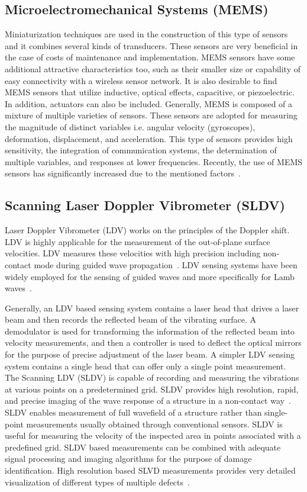 \documentclass[b5paper, 11pt, titlepage]{book}
\begin{document}
\subsection{Microelectromechanical Systems (MEMS)}
Miniaturization techniques are used in the construction of this type of sensors and it combines several kinds of transducers. These sensors are very beneficial in the case of costs of maintenance and implementation. MEMS sensors have some additional attractive characteristics too, such as their smaller size or capability of easy connectivity with a wireless sensor network. It is also desirable to find MEMS sensors that utilize inductive, optical effects, capacitive, or piezoelectric. In addition, actuators can also be included. Generally, MEMS is composed of a mixture of multiple varieties of sensors. These sensors are adopted for measuring the magnitude of distinct variables i.e. angular velocity (gyroscopes), deformation, displacement, and acceleration. This type of sensors provides high sensitivity, the integration of communication systems, the determination of multiple variables, and responses at lower frequencies. Recently, the use of MEMS sensors has significantly increased due to the mentioned factors~\cite{Farrar2012, TibaduizaBurgos2020}.

\subsection{Scanning Laser Doppler Vibrometer (SLDV)}
Laser Doppler Vibrometer (LDV) works on the principles of the Doppler shift.  LDV is highly applicable for the measurement of the out-of-plane surface velocities. LDV measures these velocities with high precision including non-contact mode during guided wave propagation~\cite{Mitra2016}. LDV sensing systems have been widely employed for the sensing of guided waves and more specifically for Lamb waves~\cite{Mitra2016}. 

Generally, an LDV based sensing system contains a laser head that drives a laser beam and then records the reflected beam of the vibrating surface. A demodulator is used for transforming the information of the reflected beam into velocity measurements, and then a controller is used to deflect the optical mirrors for the purpose of precise adjustment of the laser beam. A simpler LDV sensing system contains a single head that can offer only a single point measurement. The Scanning LDV (SLDV) is capable of recording and measuring the vibrations at various points on a predetermined grid. SLDV provides high resolution, rapid, and precise imaging of the wave response of a structure in a non-contact way~\cite{Mitra2016}. SLDV enables measurement of full wavefield of a structure rather than single-point measurements usually obtained through conventional sensors. SLDV is useful for measuring the velocity of the inspected area in points associated with a predefined grid. SLDV based measurements can be combined with adequate signal processing and imaging algorithms for the purpose of damage identification. High resolution based SLVD measurements provides very detailed visualization of different types of multiple defects~\cite{Kudela2015}.
\end{document}
